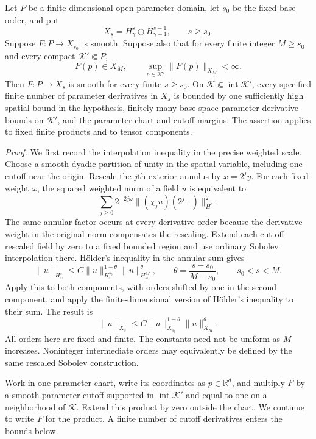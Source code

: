 \documentclass[
  english,
  11pt,
  reqno]{amsart}
\begin{document}
Let \(P\) be a finite-dimensional open parameter domain, let \(s_0\) be
the fixed base order, and put%
 \[
X_s=H^s_\gamma\oplus H^{s-1}_{\gamma-1},\qquad s\ge s_0.
\] Suppose \(F:P\to X_{s_0}\) is smooth. Suppose also that for every
finite integer \(M\ge s_0\) and every compact \(\mathcal K'\Subset P\),%
 \[
F(p)\in X_M,\qquad
\sup_{p\in\mathcal K'}\|F(p)\|_{X_M}<\infty.
\] Then \(F:P\to X_s\) is smooth for every finite \(s\ge s_0\). On
\(\mathcal K\Subset\operatorname{int}\mathcal K'\), every specified
finite number of parameter derivatives in \(X_s\) is bounded by one
sufficiently high spatial bound in
\hyperref[eq:online-parameter-higher-bounds]{the hypothesis}, finitely
many base-space parameter derivative bounds on \(\mathcal K'\), and the
parameter-chart and cutoff margins. The assertion applies to fixed
finite products and to tensor components.

\emph{Proof.} We first record the interpolation inequality in the
precise weighted scale. Choose a smooth dyadic partition of unity in the
spatial variable, including one cutoff near the origin. Rescale the
\(j\)th exterior annulus by \(x=2^jy\). For each fixed weight
\(\omega\), the squared weighted norm of a field \(u\) is equivalent to
\[
\sum_{j\ge0}2^{-2j\omega}
  \bigl\|(\chi_j u)(2^j\,\cdot)\bigr\|_{H^s}^2.
\] The same annular factor occurs at every derivative order because the
derivative weight in the original norm compensates the rescaling. Extend
each cut-off rescaled field by zero to a fixed bounded region and use
ordinary Sobolev interpolation there. Hölder's inequality in the annular
sum gives \[
\|u\|_{H^s_\omega}
 \le C\|u\|_{H^{s_0}_\omega}^{1-\theta}
          \|u\|_{H^M_\omega}^{\theta},
\qquad
\theta=\frac{s-s_0}{M-s_0},\qquad s_0<s<M.
\] Apply this to both components, with orders shifted by one in the
second component, and apply the finite-dimensional version of Hölder's
inequality to their sum. The result is%
 \[
\|u\|_{X_s}
 \le C\|u\|_{X_{s_0}}^{1-\theta}\|u\|_{X_M}^{\theta}.
\] All orders here are fixed and finite. The constants need not be
uniform as \(M\) increases. Noninteger intermediate orders may
equivalently be defined by the same rescaled Sobolev construction.

Work in one parameter chart, write its coordinates as
\(p\in\mathbb R^d\), and multiply \(F\) by a smooth parameter cutoff
supported in \(\operatorname{int}\mathcal K'\) and equal to one on a
neighborhood of \(\mathcal K\). Extend this product by zero outside the
chart. We continue to write \(F\) for the product. A finite number of
cutoff derivatives enters the bounds below.
\end{document}
